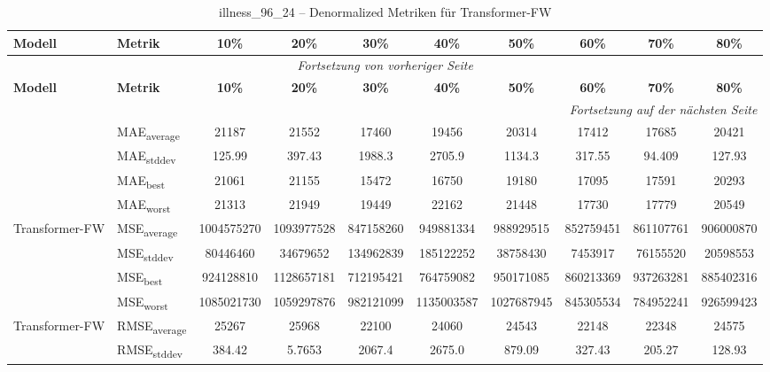 {\small
\begin{longtable}{l l c c c c c c c c}
    \toprule
    \textbf{Modell} & \textbf{Metrik} & \textbf{10\%} & \textbf{20\%} & \textbf{30\%} & \textbf{40\%} & \textbf{50\%} & \textbf{60\%} & \textbf{70\%} & \textbf{80\%} \\
    \midrule
    \endfirsthead
    \multicolumn{10}{c}{\textit{Fortsetzung von vorheriger Seite}} \\
    \toprule
    \textbf{Modell} & \textbf{Metrik} & \textbf{10\%} & \textbf{20\%} & \textbf{30\%} & \textbf{40\%} & \textbf{50\%} & \textbf{60\%} & \textbf{70\%} & \textbf{80\%} \\
    \midrule
    \endhead
    \midrule
    \multicolumn{10}{r}{\textit{Fortsetzung auf der nächsten Seite}} \\
    \midrule
    \endfoot
    \bottomrule
    \caption{illness_96_24 -- Denormalized Metriken für Transformer-FW}
    \label{tab:illness_96_24_denormalized_transformer-fw}
    \endlastfoot
\multirow{4}{*}{Transformer-FW} & MAE\textsubscript{average} & 21187 & 21552 & 17460 & 19456 & 20314 & 17412 & 17685 & 20421 \\
 & MAE\textsubscript{stddev} & 125.99 & 397.43 & 1988.3 & 2705.9 & 1134.3 & 317.55 & 94.409 & 127.93 \\
 & MAE\textsubscript{best} & 21061 & 21155 & 15472 & 16750 & 19180 & 17095 & 17591 & 20293 \\
 & MAE\textsubscript{worst} & 21313 & 21949 & 19449 & 22162 & 21448 & 17730 & 17779 & 20549 \\
\cmidrule(lr){2-10}
\multirow{4}{*}{Transformer-FW} & MSE\textsubscript{average} & 1004575270 & 1093977528 & 847158260 & 949881334 & 988929515 & 852759451 & 861107761 & 906000870 \\
 & MSE\textsubscript{stddev} & 80446460 & 34679652 & 134962839 & 185122252 & 38758430 & 7453917 & 76155520 & 20598553 \\
 & MSE\textsubscript{best} & 924128810 & 1128657181 & 712195421 & 764759082 & 950171085 & 860213369 & 937263281 & 885402316 \\
 & MSE\textsubscript{worst} & 1085021730 & 1059297876 & 982121099 & 1135003587 & 1027687945 & 845305534 & 784952241 & 926599423 \\
\cmidrule(lr){2-10}
\multirow{4}{*}{Transformer-FW} & RMSE\textsubscript{average} & 25267 & 25968 & 22100 & 24060 & 24543 & 22148 & 22348 & 24575 \\
 & RMSE\textsubscript{stddev} & 384.42 & 5.7653 & 2067.4 & 2675.0 & 879.09 & 327.43 & 205.27 & 128.93 \\

\end{longtable}}
